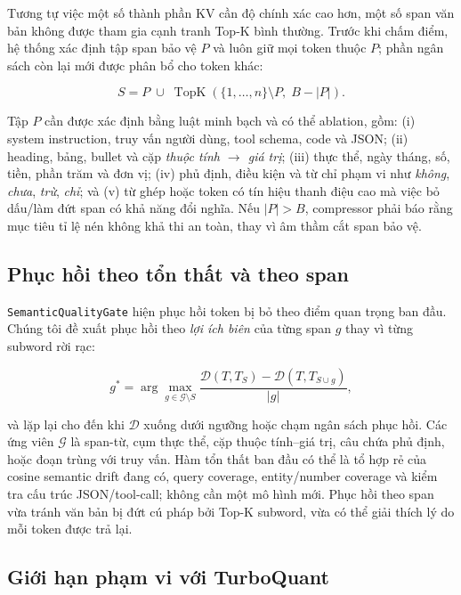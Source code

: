\documentclass[12pt,a4paper]{article}
\newcommand{\viet}[1]{\textit{#1}}           %
\begin{document}
Tương tự việc một số thành phần KV cần độ chính xác cao hơn, một số span văn bản không được tham gia cạnh tranh Top-K bình thường. Trước khi chấm điểm, hệ thống xác định tập span bảo vệ $P$ và luôn giữ mọi token thuộc $P$; phần ngân sách còn lại mới được phân bổ cho token khác:

\begin{equation}\label{eq:protected_budget}
    S = P \;\cup\; \operatorname{TopK}\!\left(\{1,\ldots,n\}\setminus P,\; B-|P|\right).
\end{equation}

Tập $P$ cần được xác định bằng luật minh bạch và có thể ablation, gồm: (i) system instruction, truy vấn người dùng, tool schema, code và JSON; (ii) heading, bảng, bullet và cặp \textit{thuộc tính $\to$ giá trị}; (iii) thực thể, ngày tháng, số, tiền, phần trăm và đơn vị; (iv) phủ định, điều kiện và từ chỉ phạm vi như \viet{không}, \viet{chưa}, \viet{trừ}, \viet{chỉ}; và (v) từ ghép hoặc token có tín hiệu thanh điệu cao mà việc bỏ dấu/làm đứt span có khả năng đổi nghĩa. Nếu $|P|>B$, compressor phải báo rằng mục tiêu tỉ lệ nén không khả thi an toàn, thay vì âm thầm cắt span bảo vệ.

\subsection{Phục hồi theo tổn thất và theo span}

\texttt{SemanticQualityGate} hiện phục hồi token bị bỏ theo điểm quan trọng ban đầu. Chúng tôi đề xuất phục hồi theo \textit{lợi ích biên} của từng span $g$ thay vì từng subword rời rạc:

\begin{equation}\label{eq:loss_aware_restore}
    g^* = \arg\max_{g \in \mathcal{G}\setminus S}
    \frac{\mathcal{D}(T,T_S)-\mathcal{D}(T,T_{S\cup g})}{|g|},
\end{equation}

và lặp lại cho đến khi $\mathcal{D}$ xuống dưới ngưỡng hoặc chạm ngân sách phục hồi. Các ứng viên $\mathcal{G}$ là span-từ, cụm thực thể, cặp thuộc tính--giá trị, câu chứa phủ định, hoặc đoạn trùng với truy vấn. Hàm tổn thất ban đầu có thể là tổ hợp rẻ của cosine semantic drift đang có, query coverage, entity/number coverage và kiểm tra cấu trúc JSON/tool-call; không cần một mô hình mới. Phục hồi theo span vừa tránh văn bản bị đứt cú pháp bởi Top-K subword, vừa có thể giải thích lý do mỗi token được trả lại.

\subsection{Giới hạn phạm vi với TurboQuant}
\end{document}
